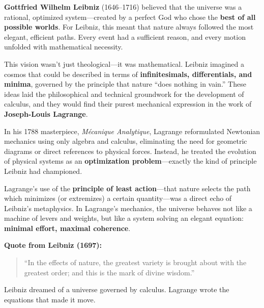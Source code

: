 \begin{tcolorbox}[colback=blue!5!white, colframe=blue!50!black, 
    title={Historical Sidebar: Lagrange and the Calculus of the Best Possible World}]
    
        \textbf{Gottfried Wilhelm Leibniz} (1646–1716) believed that the universe was a rational, optimized system—created by a perfect God who chose the \textbf{best of all possible worlds}. For Leibniz, this meant that nature always followed the most elegant, efficient paths. Every event had a sufficient reason, and every motion unfolded with mathematical necessity.
    
        \medskip
    
        This vision wasn’t just theological—it was mathematical. Leibniz imagined a cosmos that could be described in terms of \textbf{infinitesimals, differentials, and minima}, governed by the principle that nature “does nothing in vain.” These ideas laid the philosophical and technical groundwork for the development of calculus, and they would find their purest mechanical expression in the work of \textbf{Joseph-Louis Lagrange}.
    
        \medskip
    
        In his 1788 masterpiece, \textit{Mécanique Analytique}, Lagrange reformulated Newtonian mechanics using only algebra and calculus, eliminating the need for geometric diagrams or direct references to physical forces. Instead, he treated the evolution of physical systems as an \textbf{optimization problem}—exactly the kind of principle Leibniz had championed.
    
        \medskip
    
        Lagrange’s use of the \textbf{principle of least action}—that nature selects the path which minimizes (or extremizes) a certain quantity—was a direct echo of Leibniz’s metaphysics. In Lagrange’s mechanics, the universe behaves not like a machine of levers and weights, but like a system solving an elegant equation: \textbf{minimal effort, maximal coherence}.
    
        \medskip
    
        \textbf{Quote from Leibniz (1697):}
        \begin{quote}
        “In the effects of nature, the greatest variety is brought about with the greatest order; and this is the mark of divine wisdom.”
        \end{quote}
    
        Leibniz dreamed of a universe governed by calculus. Lagrange wrote the equations that made it move.
    
\end{tcolorbox}